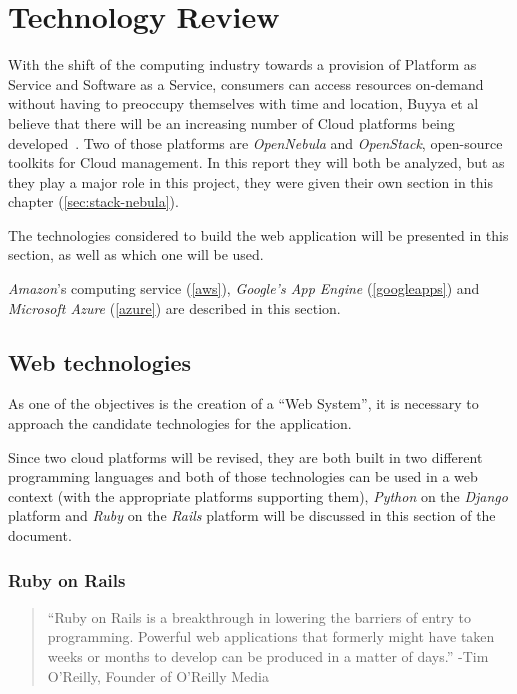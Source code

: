 \section{Technology Review}\label{sec:developments-apps-services}

With the shift of the computing industry towards a provision of Platform as Service and Software as a Service, consumers can access resources on-demand without having to preoccupy themselves with time and location, Buyya et al believe that there will be an increasing number of Cloud platforms being developed~\cite{Buyya2009599}. Two of those platforms are \textit{OpenNebula} and \textit{OpenStack}, open-source toolkits for Cloud management. In this report they will both be analyzed, but as they play a major role in this project, they were given their own section in this chapter (\ref{sec:stack-nebula}).

The technologies considered to build the web application will be presented in this section, as well as which one will be used.

\textit{Amazon}'s computing service (\ref{aws}), \textit{Google's App Engine} (\ref{googleapps}) and \textit{Microsoft Azure} (\ref{azure}) are described in this section.

\subsection{Web technologies}\label{subsec:web-tech}

As one of the objectives is the creation of a ``Web System'', it is necessary to approach the candidate technologies for the application.

Since two cloud platforms will be revised, they are both built in two different programming languages and both of those technologies can be used in a web context (with the appropriate platforms supporting them), \textit{Python} on the \textit{Django} platform and \textit{Ruby} on the \textit{Rails} platform will be discussed in this section of the document.

\subsubsection{Ruby on Rails}\label{ruby}

\begin{quote}
``Ruby on Rails is a breakthrough in lowering the barriers of entry to programming. Powerful web applications that formerly might have taken weeks or months to develop can be produced in a matter of days.'' -Tim O’Reilly, Founder of O’Reilly Media~\cite{rubyonrails}
\end{quote}

